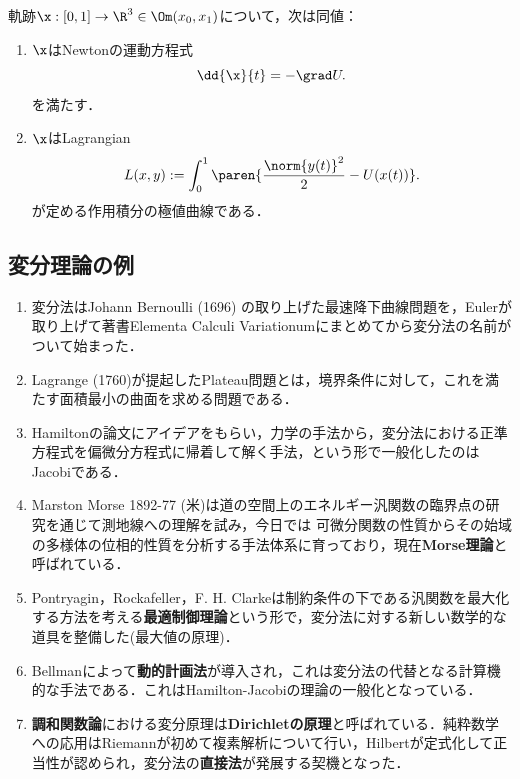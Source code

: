 \documentclass[uplatex,dvipdfmx]{jsreport}
\begin{document}
\begin{theorem}
    軌跡$\x:[0,1]\to\R^3\in\Om(x_0,x_1)$について，次は同値：
    \begin{enumerate}
        \item $\x$はNewtonの運動方程式
        \[\dd{\x}{t}=-\grad U.\]
        を満たす．
        \item $\x$はLagrangian
        \[L(x,y):=\int^1_0\paren{\frac{\norm{y(t)}^2}{2}-U(x(t))}.\]
        が定める作用積分の極値曲線である．
    \end{enumerate}
\end{theorem}

\subsection{変分理論の例}

\begin{history}\mbox{}
    \begin{enumerate}
        \item 変分法はJohann Bernoulli (1696) の取り上げた最速降下曲線問題を，Eulerが取り上げて著書Elementa Calculi Variationumにまとめてから変分法の名前がついて始まった．
        \item Lagrange (1760)が提起したPlateau問題とは，境界条件に対して，これを満たす面積最小の曲面を求める問題である．
        \item Hamiltonの論文にアイデアをもらい，力学の手法から，変分法における正準方程式を偏微分方程式に帰着して解く手法，という形で一般化したのはJacobiである．
        \item Marston Morse 1892-77 (米)は道の空間上のエネルギー汎関数の臨界点の研究を通じて測地線への理解を試み，今日では
        可微分関数の性質からその始域の多様体の位相的性質を分析する手法体系に育っており，現在\textbf{Morse理論}と呼ばれている．
        \item Pontryagin，Rockafeller，F. H. Clarkeは制約条件の下である汎関数を最大化する方法を考える\textbf{最適制御理論}という形で，変分法に対する新しい数学的な道具を整備した(最大値の原理)．
        \item Bellmanによって\textbf{動的計画法}が導入され，これは変分法の代替となる計算機的な手法である．これはHamilton-Jacobiの理論の一般化となっている．
        \item \textbf{調和関数論}における変分原理は\textbf{Dirichletの原理}と呼ばれている．純粋数学への応用はRiemannが初めて複素解析について行い，Hilbertが定式化して正当性が認められ，変分法の\textbf{直接法}が発展する契機となった．
    \end{enumerate}
\end{history}
\end{document}
